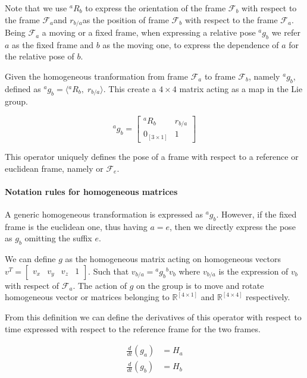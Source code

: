 \documentclass[12pt,a4paper]{book}
\newcommand{\Fa}{\ensuremath{\mathcal{F}_a}}
\newcommand{\Fb}{\ensuremath{\mathcal{F}_b}}
\newcommand{\Fe}{\ensuremath{\mathcal{F}_e}}
\newcommand{\agb}{\ensuremath{{^a g _b}}}
\newcommand{\aRb}{\ensuremath{{^a R _b}}}
\newcommand{\rba}{\ensuremath{{r_{b/a}}}}
\begin{document}
Note that we use \aRb{} to express the orientation of the frame \Fb{} with respect to the frame \Fa and \rba as the position of frame \Fb{} with respect to the frame \Fa{}. Being \Fa{} a moving or a fixed frame, when expressing a relative pose $^a g _b$ we refer $a$ as the fixed frame and $b$ as the moving one, to express the dependence of $a$ for the relative pose of $b$.

Given the homogeneous tranformation from frame \Fa{} to frame \Fb{}, namely \agb{}, defined as $\agb = \langle \aRb,\; \rba \rangle$. This create a $4 \times 4$ matrix acting as a map in the Lie group.



\begin{equation}
	\agb = 
	\begin{bmatrix}
		\aRb			&	\rba	\\
		0_{[3\times1]}	&	1
	\end{bmatrix}
\end{equation}

This operator uniquely defines the pose of a frame with respect to a reference or euclidean frame, namely \Fw{} or \Fe{}.

\paragraph{Notation rules for homogeneous matrices} A generic homogeneous transformation is expressed as ${^a g _b}$. However, if the fixed frame is the euclidean one, thus having $a=e$, then we directly express the pose as $g_b$ omitting the suffix $e$.


We can define $g$ as the homogeneous matrix acting on homogeneous vectors $v^T = \begin{bmatrix}v_x	&	v_y	&	v_z	&	1\end{bmatrix}$. Such that $v_{b/a} = {^ag_b} {^b v_b}$ where $v_{b/a}$ is the expression of $v_b$ with respect of \Fa{}. The action of $g$ on the group is to move and rotate homogeneous vector or matrices belonging to $\mathbb{R}^{[4 \times 1]}$ and $\mathbb{R}^{[4 \times 4]}$ respectively.




From this definition we can define the derivatives of this operator with respect to time expressed with respect to the reference frame for the two frames.

\begin{equation}
\begin{aligned}
	\frac{d}{dt}\left( g_a \right) &= H_{a} \\
	\frac{d}{dt}\left( g_b \right) &= H_{b}
\end{aligned}
\end{equation}
\end{document}
